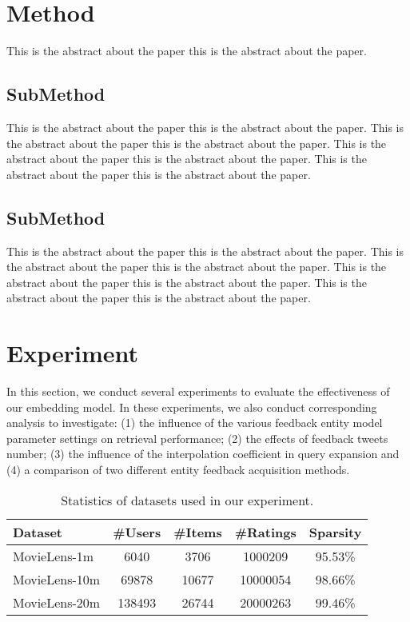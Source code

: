 \documentclass{sig-alternate-05-2015}
\begin{document}
\section{Method}
This is the abstract about the paper this is the abstract about the paper.

\subsection{SubMethod}
This is the abstract about the paper this is the abstract about the paper.
This is the abstract about the paper this is the abstract about the paper.
This is the abstract about the paper this is the abstract about the paper.
This is the abstract about the paper this is the abstract about the paper.

\subsection{SubMethod}
This is the abstract about the paper this is the abstract about the paper.
This is the abstract about the paper this is the abstract about the paper.
This is the abstract about the paper this is the abstract about the paper.
This is the abstract about the paper this is the abstract about the paper.

\section{Experiment}
In this section, we conduct several experiments to evaluate the effectiveness of our embedding model.
In these experiments, we also conduct corresponding analysis to investigate:
(1) the influence of the various feedback entity model parameter settings on
retrieval performance;
(2) the effects of feedback tweets number;
(3) the influence of the interpolation coefficient in query expansion and
(4) a comparison of two different entity feedback acquisition methods.

\begin{table}[htpb]
	\centering
	\caption{Statistics of datasets used in our experiment.}
	\label{tab:topics}
	\begin{tabular}{|l|c|c|c|c|}
		\hline
		\textbf{Dataset} & \textbf{\#Users} & \textbf{\#Items} & \textbf{\#Ratings} & \textbf{Sparsity} \\
		\hline
		MovieLens-1m  & 6040   & 3706  & 1000209  & 95.53\% \\
		MovieLens-10m & 69878  & 10677 & 10000054 & 98.66\% \\
		MovieLens-20m & 138493 & 26744 & 20000263 & 99.46\% \\
		\hline
	\end{tabular}
\end{table}
\end{document}
